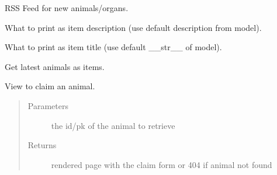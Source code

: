 \documentclass[letterpaper,10pt,openany,oneside,english]{sphinxmanual}
\begin{document}

\begin{fulllineitems}
\label{\detokenize{index:animals.views.LatestAnimalsFeed}}
RSS Feed for new animals/organs.

\begin{fulllineitems}
\label{\detokenize{index:animals.views.LatestAnimalsFeed.item_description}}
What to print as item description (use default description from model).

\end{fulllineitems}


\begin{fulllineitems}
\label{\detokenize{index:animals.views.LatestAnimalsFeed.item_title}}
What to print as item title (use default \_\_str\_\_ of model).

\end{fulllineitems}


\begin{fulllineitems}
\label{\detokenize{index:animals.views.LatestAnimalsFeed.items}}
Get latest animals as items.

\end{fulllineitems}


\end{fulllineitems}


\begin{fulllineitems}
\label{\detokenize{index:animals.views.claim}}
View to claim an animal.
\begin{quote}\begin{description}
\item[{Parameters}] \leavevmode
{} \textendash{} the id/pk of the animal to retrieve

\item[{Returns}] \leavevmode
rendered page with the claim form
or 404 if animal not found

\end{description}\end{quote}

\end{fulllineitems}
\end{document}
